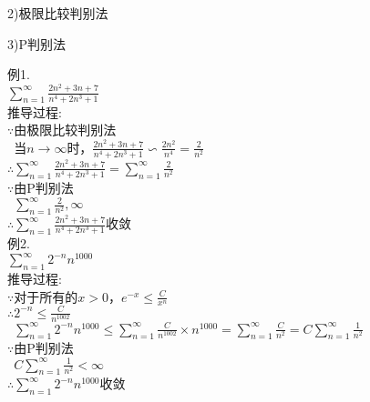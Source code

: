 2)极限比较判别法\\
\begin{center}
\end{center}\vspace{4ex}

3)P判别法\\
\begin{center}
\end{center}
例1.\\
$\displaystyle\sum_{n=1}^{\infty}\frac{2n^2+3n+7}{n^4+2n^3+1}$\\
推导过程:\\
$\because$由极限比较判别法\\
$\phantom{\because}$当$n\to\infty$时，$\displaystyle\frac{2n^2+3n+7}{n^4+2n^3+1}\backsim\frac{2n^2}{n^4}=\frac{2}{n^2}$\\
$\therefore\displaystyle\sum_{n=1}^{\infty}\frac{2n^2+3n+7}{n^4+2n^3+1}=\sum_{n=1}^{\infty}\frac{2}{n^2}$\\
$\because$由P判别法\\
$\phantom{\because}\displaystyle\sum_{n=1}^{\infty}\frac{2}{n^2},\infty$\\
$\therefore\displaystyle\sum_{n=1}^{\infty}\frac{2n^2+3n+7}{n^4+2n^3+1}$收敛\\[1ex]
例2.\\
$\displaystyle\sum_{n=1}^{\infty}2^{-n}n^{1000}$\\
推导过程:\\
$\because$对于所有的$x>0$，$\displaystyle e^{-x}\leqslant\frac{C}{x^n}$\\
$\therefore\displaystyle 2^{-n}\leqslant\frac{C}{n^{1002}}$\\
$\phantom{\therefore}\displaystyle\sum_{n=1}^{\infty}2^{-n}n^{1000}\leqslant\sum_{n=1}^{\infty}\frac{C}{n^{1002}}\times n^{1000}=\sum_{n=1}^{\infty}\frac{C}{n^2}=C\sum_{n=1}^{\infty}\frac{1}{n^2}$\\
$\because$由P判别法\\
$\phantom{\because}\displaystyle C\sum_{n=1}^{\infty}\frac{1}{n^2}<\infty$\\
$\therefore\displaystyle\sum_{n=1}^{\infty}2^{-n}n^{1000}$收敛

